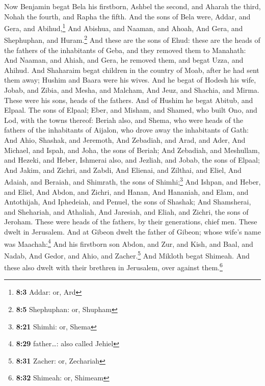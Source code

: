  Now Benjamin begat Bela his firstborn, Ashbel the second,
and Aharah the third,  Nohah the fourth, and Rapha the
fifth.  And the sons of Bela were, Addar, and Gera, and
Abihud,\footnote{\textbf{8:3} Addar: or, Ard}  And
Abishua, and Naaman, and Ahoah,  And Gera, and Shephuphan,
and Huram.\footnote{\textbf{8:5} Shephuphan: or, Shupham} 
And these are the sons of Ehud: these are the heads of the fathers of
the inhabitants of Geba, and they removed them to Manahath:
 And Naaman, and Ahiah, and Gera, he removed them, and
begat Uzza, and Ahihud.  And Shaharaim begat children in
the country of Moab, after he had sent them away; Hushim and Baara were
his wives.  And he begat of Hodesh his wife, Jobab, and
Zibia, and Mesha, and Malcham,  And Jeuz, and Shachia,
and Mirma. These were his sons, heads of the fathers. 
And of Hushim he begat Abitub, and Elpaal.  The sons of
Elpaal; Eber, and Misham, and Shamed, who built Ono, and Lod, with the
towns thereof:  Beriah also, and Shema, who were heads of
the fathers of the inhabitants of Aijalon, who drove away the
inhabitants of Gath:  And Ahio, Shashak, and Jeremoth,
 And Zebadiah, and Arad, and Ader,  And
Michael, and Ispah, and Joha, the sons of Beriah;  And
Zebadiah, and Meshullam, and Hezeki, and Heber,  Ishmerai
also, and Jezliah, and Jobab, the sons of Elpaal;  And
Jakim, and Zichri, and Zabdi,  And Elienai, and Zilthai,
and Eliel,  And Adaiah, and Beraiah, and Shimrath, the
sons of Shimhi;\footnote{\textbf{8:21} Shimhi: or, Shema}
 And Ishpan, and Heber, and Eliel,  And
Abdon, and Zichri, and Hanan,  And Hananiah, and Elam,
and Antothijah,  And Iphedeiah, and Penuel, the sons of
Shashak;  And Shamsherai, and Shehariah, and Athaliah,
 And Jaresiah, and Eliah, and Zichri, the sons of
Jeroham.  These were heads of the fathers, by their
generations, chief men. These dwelt in Jerusalem.  And at
Gibeon dwelt the father of Gibeon; whose wife's name was
Maachah:\footnote{\textbf{8:29} father\ldots: also called Jehiel}
 And his firstborn son Abdon, and Zur, and Kish, and
Baal, and Nadab,  And Gedor, and Ahio, and
Zacher.\footnote{\textbf{8:31} Zacher: or, Zechariah} 
And Mikloth begat Shimeah. And these also dwelt with their brethren in
Jerusalem, over against them.\footnote{\textbf{8:32} Shimeah: or,
  Shimeam}

